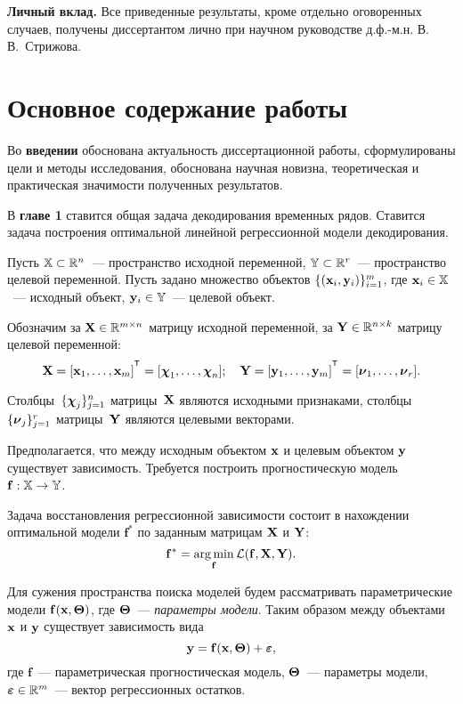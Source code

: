 \documentclass[11pt, a5paper]{dissert}
\begin{document}
\vspace{0.5cm}
\textbf{Личный вклад.}
Все приведенные результаты, кроме отдельно оговоренных случаев, получены диссертантом лично при научном руководстве д.ф.-м.н. В.\,В.~Стрижова.

\section*{Основное содержание работы}

Во \textbf{введении} обоснована актуальность диссертационной работы, сформулированы цели и методы исследования, обоснована научная новизна, теоретическая и практическая значимости полученных результатов.

В \textbf{главе 1} ставится общая задача декодирования временных рядов.
Ставится задача построения оптимальной линейной регрессионной модели декодирования.

Пусть $\mathbb{X} \subset \mathbb{R}^n$~--- пространство исходной переменной, $\mathbb{Y} \subset \mathbb{R}^r$~--- пространство целевой переменной.
Пусть задано множество объектов $\{(\mathbf{x}_i, \mathbf{y}_i)\}_{i=1}^m$, где $\mathbf{x}_i \in \mathbb{X}$~--- исходный объект, $\mathbf{y}_i \in \mathbb{Y}$~--- целевой объект.

Обозначим за $\mathbf{X} \in \mathbb{R}^{m \times n}$ матрицу исходной переменной, за $\mathbf{Y} \in \mathbb{R}^{n \times k}$ матрицу целевой переменной:
\begin{equation*}
	\bX = [\bx_1, \dots, \bx_m]^{\T} =  [\bchi_1, \dots, \bchi_n]; \quad \bY = [\by_1, \dots, \by_m]^{\T} =  [\bnu_1, \dots, \bnu_r].
\end{equation*}

Столбцы~$\{\boldsymbol{\chi}_j\}_{j=1}^n$ матрицы~$\mathbf{X}$ являются исходными признаками, столбцы~$\{\boldsymbol{\nu}_j\}_{j=1}^r$ матрицы~$\mathbf{Y}$ являются целевыми векторами.

Предполагается, что между исходным объектом $\mathbf{x}$ и целевым объектом $\mathbf{y}$ существует зависимость. Требуется построить прогностическую модель $\mathbf{f}: \mathbb{X} \rightarrow \mathbb{Y}$.

Задача восстановления регрессионной зависимости состоит в нахождении оптимальной модели $\mathbf{f}^*$ по заданным матрицам $\mathbf{X}$ и $\mathbf{Y}$:
\begin{equation}
	\mathbf{f}^* = \mathop{\arg \min}\limits_\mathbf{f} \mathcal{L}(\mathbf{f}, \mathbf{X}, \mathbf{Y}).
	\label{ch1:eq:loss_min}
\end{equation}

Для сужения пространства поиска моделей будем рассматривать параметрические модели $\mathbf{f}(\mathbf{x}, \boldsymbol{\Theta})$, где $\boldsymbol{\Theta}$~--- \textit{параметры модели}. 
Таким образом между объектами $\mathbf{x}$ и $\mathbf{y}$ существует зависимость вида
\begin{equation}
	\mathbf{y} = \mathbf{f}(\mathbf{x}, \boldsymbol{\Theta}) + \boldsymbol{\varepsilon},
	\label{ch1:eq:reg_model}
\end{equation}
где $\mathbf{f}$~--- параметрическая прогностическая модель, $\boldsymbol{\Theta}$~--- параметры модели, $\boldsymbol{\varepsilon} \in \mathbb{R}^{m}$~--- вектор регрессионных остатков. 
\end{document}
